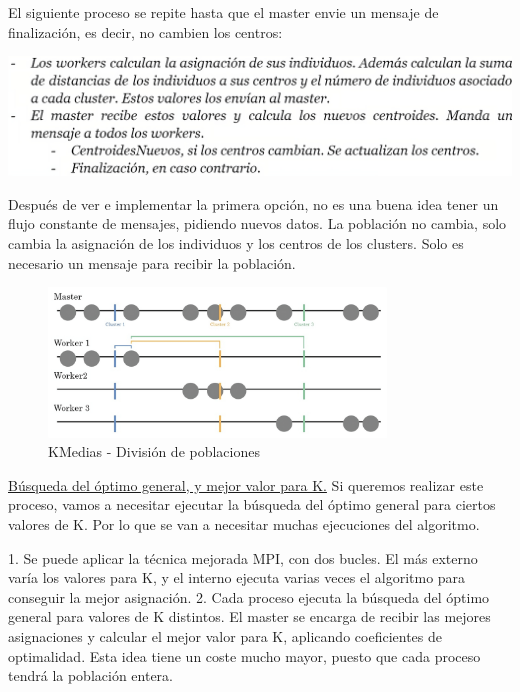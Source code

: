 		\begin{flushleft}
			El siguiente proceso se repite hasta que el master envie un mensaje de finalización, es decir, no cambien los centros:
			
			\vspace{0.2cm}
			\centering
			\includegraphics[width=1\textwidth]{images/chapter_3/kmedias_proceso}			
		\end{flushleft}	
		
		Después de ver e implementar la primera opción, no es una buena idea tener un flujo constante de mensajes, pidiendo nuevos datos. La población no cambia, solo cambia la asignación de los individuos y los centros de los clusters. Solo es necesario un mensaje para recibir la población.
		
		
		\begin{figure}
			\centering
			\includegraphics[width=0.8\textwidth]{images/chapter_3/kmedias_mpi}	
			\caption{KMedias - División de poblaciones}
			\label{kmediasdiv}
		\end{figure}
		
		\underline{Búsqueda del óptimo general, y mejor valor para K.}
		Si queremos realizar este proceso, vamos a necesitar ejecutar la búsqueda del óptimo general para ciertos valores de K. Por lo que se van a necesitar muchas ejecuciones del algoritmo.
		
		1. Se puede aplicar la técnica mejorada MPI, con dos bucles. El más externo varía los valores para K, y el interno ejecuta varias veces el algoritmo para conseguir la mejor asignación.
		2. Cada proceso ejecuta la búsqueda del óptimo general para valores de K distintos. El master se encarga de recibir las mejores asignaciones y calcular el mejor valor para K, aplicando coeficientes de optimalidad. Esta idea tiene un coste mucho mayor, puesto que cada proceso tendrá la población entera.
		
